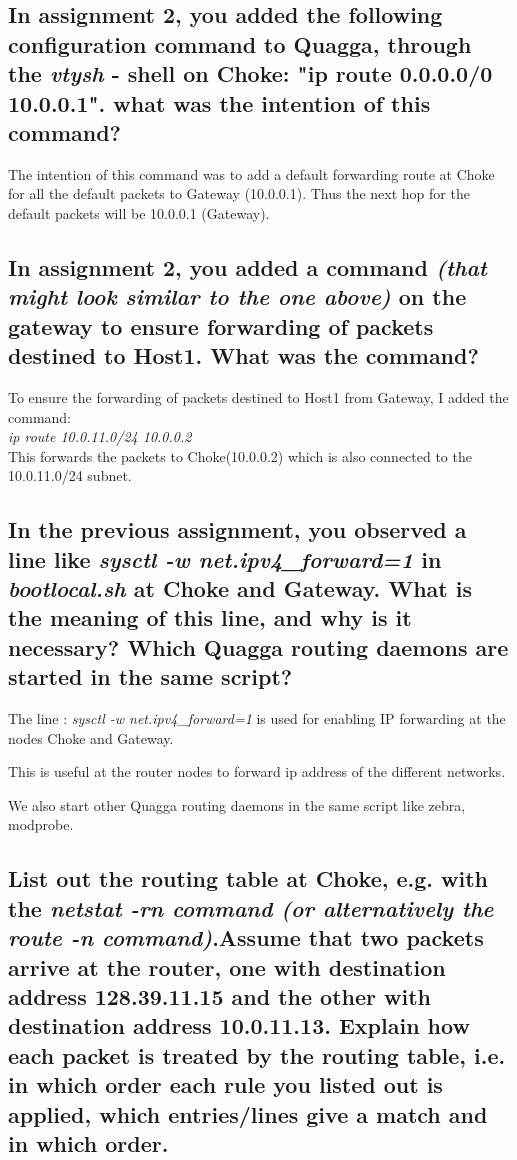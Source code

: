\documentclass{article}
\begin{document}
\subsection{In assignment 2, you added the following configuration command to Quagga, through the \textit{vtysh} - shell on Choke: "ip route 0.0.0.0/0 10.0.0.1". what was the intention of this command?}

The intention of this command was to add a default forwarding route at Choke for all the default packets to Gateway (10.0.0.1). Thus the next hop for the default packets will be 10.0.0.1 (Gateway). 


\subsection{In assignment 2, you added a command \textit{(that might look similar to the one above)} on the gateway to ensure forwarding of packets destined to Host1. What was the command?}

To ensure the forwarding of packets destined to Host1 from Gateway, I added the command:\\
\textit{ip route 10.0.11.0/24 10.0.0.2}\\
This forwards the packets to Choke(10.0.0.2) which is also connected to the 10.0.11.0/24 subnet.

\subsection{In the previous assignment, you observed a line like \textit{sysctl -w net.ipv4\_forward=1} in \textit{bootlocal.sh} at Choke and Gateway. What is the meaning of this line, and why is it necessary? Which Quagga routing daemons are started in the same script?}

The line : \textit{sysctl -w net.ipv4\_forward=1} is used for enabling IP forwarding at the nodes Choke and Gateway.

This is useful at the router nodes to forward ip address of the different networks.

We also start other Quagga routing daemons in the same script like zebra, modprobe.

\subsection{List out the routing table at Choke, e.g. with the \textit{netstat -rn command (or alternatively the route -n command)}.Assume that two packets arrive at the router, one with destination address 128.39.11.15 and the other with destination address 10.0.11.13. Explain how each packet is treated by the routing table, i.e. in which order each rule you listed out is applied, which entries/lines give a match and in which order.}
\end{document}
